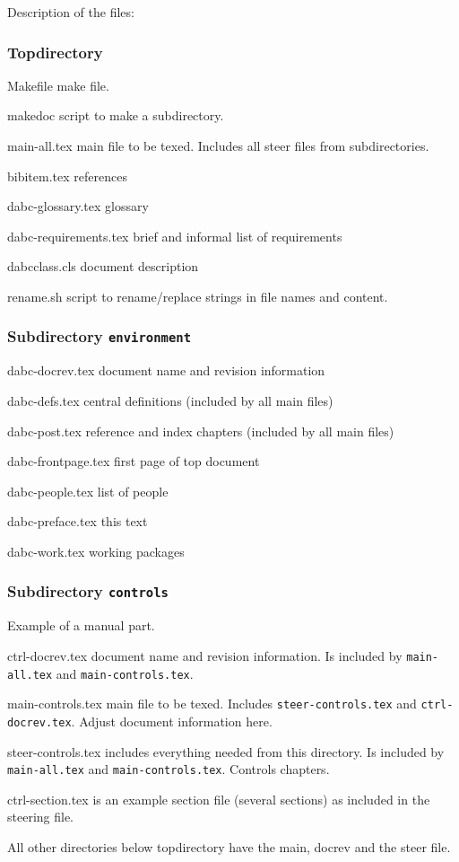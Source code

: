 \clearpage
Description of the files:
\subsubsection{Topdirectory}
\begin{compactdesc}
\item[Makefile] make file.
\item[makedoc] script to make a subdirectory.
\item[main-all.tex] main file to be texed. Includes all steer files from subdirectories.
\item[bibitem.tex] references
\item[dabc-glossary.tex] glossary
\item[dabc-requirements.tex] brief and informal list of requirements
\item[dabcclass.cls] document description
\item[rename.sh] script to rename/replace strings in file names and content.
\end{compactdesc}
\subsubsection{Subdirectory {\tt environment}}
\begin{compactdesc}
\item[dabc-docrev.tex] document name and revision information
\item[dabc-defs.tex] central definitions (included by all main files)
\item[dabc-post.tex] reference and index chapters (included by all main files)
\item[dabc-frontpage.tex] first page of top document
\item[dabc-people.tex] list of people
\item[dabc-preface.tex] this text
\item[dabc-work.tex] working packages
\end{compactdesc}
\subsubsection{Subdirectory {\tt controls}}
Example of a manual part. 
\begin{compactdesc}
\item[ctrl-docrev.tex] document name and revision information.
Is included by {\tt main-all.tex} and {\tt main-controls.tex}.
\item[main-controls.tex] main file to be texed.
Includes {\tt steer-controls.tex} and {\tt ctrl-docrev.tex}. Adjust document information here.
\item[steer-controls.tex] includes everything needed from this directory.
Is included by {\tt main-all.tex} and {\tt main-controls.tex}. Controls chapters.
\item[ctrl-section.tex] is an example section file (several sections)
 as included in the steering file.
\end{compactdesc}
All other directories below topdirectory have the main, docrev and the steer file.
